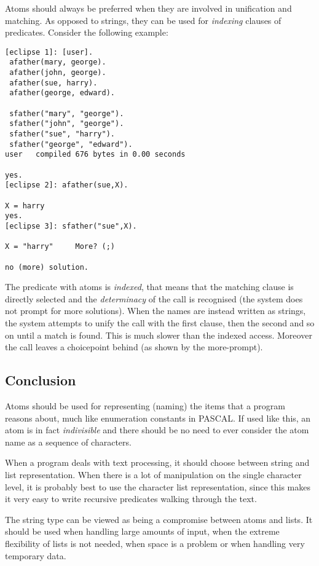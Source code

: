 Atoms should always be preferred when they are involved in unification
and matching. As opposed to strings, they can be used for {\em indexing}
clauses of predicates.
Consider the following example:
\begin{verbatim}
[eclipse 1]: [user].
 afather(mary, george).
 afather(john, george).
 afather(sue, harry).
 afather(george, edward).

 sfather("mary", "george").
 sfather("john", "george").
 sfather("sue", "harry").
 sfather("george", "edward").
user   compiled 676 bytes in 0.00 seconds

yes.
[eclipse 2]: afather(sue,X).

X = harry
yes.
[eclipse 3]: sfather("sue",X).

X = "harry"     More? (;)

no (more) solution.
\end{verbatim}
The predicate with atoms is {\em indexed}, that means that the matching
clause is directly selected and the {\em determinacy} of the call is recognised
(the system does not prompt for more solutions).
When the names are instead written as strings, the system attempts
to unify the call with the first clause, then the second and so on until
a match is found. This is much slower than the indexed access.
Moreover the call leaves a choicepoint behind (as shown by the more-prompt).

\subsection{Conclusion}
Atoms should be used for representing (naming) the items that a
program reasons about, much like enumeration constants in PASCAL.
If used like this, an atom is in fact {\em indivisible} and there should
be no need to ever consider the atom name as a sequence of characters.

When a program deals with text processing, it should choose between string
and list representation.
When there is a lot of
manipulation on the single character level, it is probably best to use
the character list representation, since this
makes it very easy to write recursive predicates walking through the text.

The string type can be viewed as being a compromise between atoms and lists.
It should be used when handling large amounts of input, when the extreme
flexibility of lists is not needed, when space is a problem or when
handling very temporary data.


